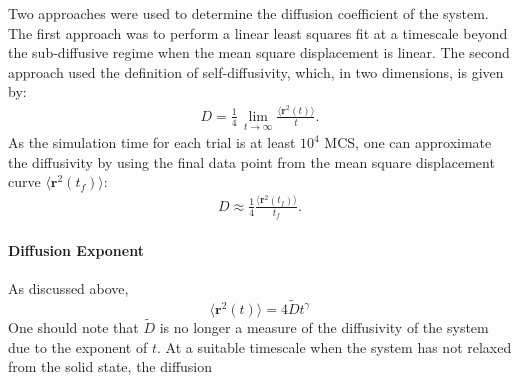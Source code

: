 \documentclass[a4paper,12pt]{article}
\begin{document}
Two approaches were used to determine the diffusion coefficient of the system. The first approach was to perform a linear least squares fit at a timescale beyond the sub-diffusive regime when the mean square displacement is linear. The second approach used the definition of self-diffusivity, which, in two dimensions, is given by:
\begin{eqnarray}
D = \frac{1}{4}\, \lim_{t \rightarrow \infty} \frac{\langle{\bm{r}^2(t)\rangle}}{t}.
\end{eqnarray}
As the simulation time for each trial is at least $10^4$ MCS, one can approximate the diffusivity by using the final data point from the mean square displacement curve $\langle{\bm{r}^2(t_f)\rangle}$:
\begin{eqnarray}
D \approx \frac{1}{4} \frac{\langle{\bm{r}^2(t_f)\rangle}}{t_f}.
\end{eqnarray}

\paragraph{Diffusion Exponent}
As discussed above, 
\begin{equation}
\langle\bm{r}^2(t)\rangle = 4\tilde Dt^{\gamma}
\end{equation}
One should note that $\tilde D$ is no longer a measure of the diffusivity of the system due to the exponent of $t$. At a suitable timescale when the system has not relaxed from the solid state, the diffusion

%
%
%
\end{document}
